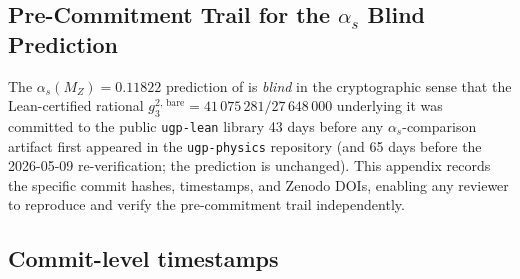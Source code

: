 \documentclass[11pt]{article}
\theoremstyle{remark}
\begin{document}
\begin{appendices}
\section{Pre-Commitment Trail for the $\alpha_s$ Blind Prediction}
\label{app:alpha_s_precommit}

\sloppy

The $\alpha_s(M_Z) = 0.11822$ prediction of  is \emph{blind} in the cryptographic sense that the Lean-certified rational $g_3^{2,\,\mathrm{bare}} = 41\,075\,281/27\,648\,000$ underlying it was committed to the public \texttt{ugp-lean} library 43 days before any $\alpha_s$-comparison artifact first appeared in the \texttt{ugp-physics} repository (and 65 days before the 2026-05-09 re-verification; the prediction is unchanged).  This appendix records the specific commit hashes, timestamps, and Zenodo DOIs, enabling any reviewer to reproduce and verify the pre-commitment trail independently.

\subsection*{Commit-level timestamps}


\end{appendices}
\end{document}
